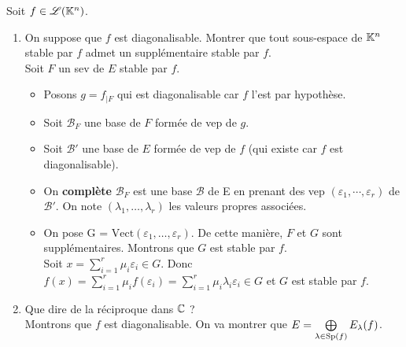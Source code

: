 Soit $f \in \mathscr{L}(\mathbb{K}^n)$.

\begin{enumerate}
    \item On suppose que $f$ est diagonalisable. Montrer que tout sous-espace de $\mathbb{K}^n$ stable par $f$ admet un supplémentaire stable par $f$.\\
    Soit $F$ un sev de $E$ stable par $f$.
    \begin{itemize}
        \item Posons $\boxed{g = f_{\vert F}}$ qui est diagonalisable car $f$ l'est par hypothèse. 
        \item Soit $\mathscr{B}_F$ une base de $F$ formée de vep de $g$. 
        \item Soit $\mathscr{B}'$ une base de $E$ formée de vep de $f$ (qui existe car $f$ est diagonalisable).
        \item On \textbf{complète} $\mathscr{B}_F$ est une base $\mathscr{B}$ de E en prenant des vep $(\varepsilon_1, \cdots, \varepsilon_r)$ de $\mathscr{B}'$. On note $(\lambda_1, \dots, \lambda_r)$ les valeurs propres associées. 
        \item On pose G = $\mathrm{Vect}(\varepsilon_1, \dots, \varepsilon_r)$. De cette manière, $F$ et $G$ sont supplémentaires. Montrons que $G$ est stable par $f$. \\
        Soit $x = \sum\limits_{i=1}^{r} \mu_i \varepsilon_i \in G$. Donc $f(x) = \sum\limits_{i=1}^{r} \mu_i f(\varepsilon_i) =  \sum\limits_{i=1}^{r} \mu_i \lambda_i \varepsilon_i \in G$ et $G$ est stable par $f$.
    \end{itemize}
    
    \item Que dire de la réciproque dans $\mathbb{C}$ ? \\
    Montrons que $f$ est diagonalisable. On va montrer que $E = \bigoplus\limits_{\lambda \in \mathrm{Sp}(f)} E_\lambda (f)$.
    

\end{enumerate}

